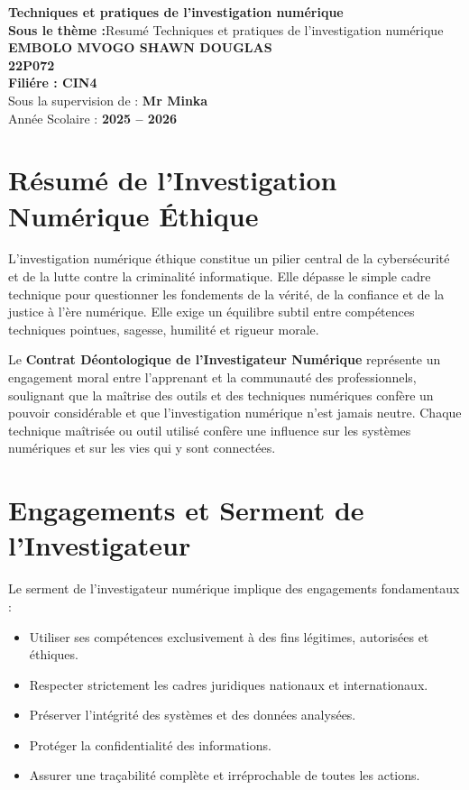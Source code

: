 \documentclass[12pt]{article}
\begin{document}
\vspace{2cm}

\begin{center}
    {\LARGE \textbf{Techniques et pratiques de l'investigation numérique}}\\[0.5cm]
    {\large \textbf{Sous le thème :}Resumé Techniques et pratiques de l'investigation numérique}\\[2cm]

    \textbf{{EMBOLO MVOGO SHAWN DOUGLAS}}\\[0.8cm]
    \textbf{{22P072}}\\[0.8cm]
    \textbf{{Filiére : CIN4}}\\[0.8cm]
    Sous la supervision de : \textbf{Mr Minka}\\[1.5cm]

    Année Scolaire : \textbf{2025 -- 2026}
\end{center}

\section*{Résumé de l’Investigation Numérique Éthique}

L’investigation numérique éthique constitue un pilier central de la cybersécurité et de la lutte contre la criminalité informatique. Elle dépasse le simple cadre technique pour questionner les fondements de la vérité, de la confiance et de la justice à l’ère numérique. Elle exige un équilibre subtil entre compétences techniques pointues, sagesse, humilité et rigueur morale. 

Le \textbf{Contrat Déontologique de l’Investigateur Numérique} représente un engagement moral entre l’apprenant et la communauté des professionnels, soulignant que la maîtrise des outils et des techniques numériques confère un pouvoir considérable et que l’investigation numérique n’est jamais neutre. Chaque technique maîtrisée ou outil utilisé confère une influence sur les systèmes numériques et sur les vies qui y sont connectées.

\section{Engagements et Serment de l’Investigateur}
Le serment de l’investigateur numérique implique des engagements fondamentaux :

\begin{itemize}[leftmargin=*]
    \item Utiliser ses compétences exclusivement à des fins légitimes, autorisées et éthiques.
    \item Respecter strictement les cadres juridiques nationaux et internationaux.
    \item Préserver l’intégrité des systèmes et des données analysées.
    \item Protéger la confidentialité des informations.
    \item Assurer une traçabilité complète et irréprochable de toutes les actions.
\end{itemize}
\end{document}
